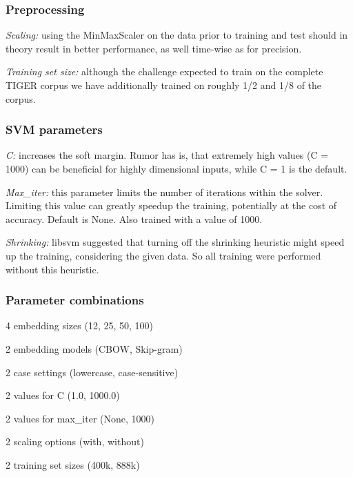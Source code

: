 \documentclass[11pt,a4paper]{article}
\begin{document}
\subsubsection{Preprocessing}
\begin{itemize*}
	\item \emph{Scaling:} using the MinMaxScaler on the data prior to training and test should in theory result in better performance, as well time-wise as for precision.
	\item \emph{Training set size:} although the challenge expected to train on the complete TIGER corpus we have additionally trained on roughly 1/2 and 1/8 of the corpus.
\end{itemize*}

\subsubsection{SVM parameters}
\begin{itemize*}
	\item \emph{C:} increases the soft margin. Rumor has is, that extremely high values (C = 1000) can be beneficial for highly dimensional inputs, while C = 1 is the default.
	\item \emph{Max\_iter:} this parameter limits the number of iterations within the solver. Limiting this value can greatly speedup the training, potentially at the cost of accuracy. Default is None. Also trained with a value of 1000.
	\item \emph{Shrinking:} libsvm suggested that turning off the shrinking heuristic might speed up the training, considering the given data. So all training were performed without this heuristic.
\end{itemize*}

\subsubsection{Parameter combinations}
\begin{itemize*}
	\item 4 embedding sizes (12, 25, 50, 100)
	\item 2 embedding models (CBOW, Skip-gram)
	\item 2 case settings (lowercase, case-sensitive)
	\item 2 values for C (1.0, 1000.0)
	\item 2 values for max\_iter (None, 1000)
	\item 2 scaling options (with, without)
	\item 2 training set sizes (400k, 888k)
\end{itemize*}
\end{document}
